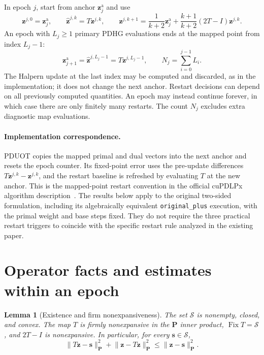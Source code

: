 \documentclass[11pt]{article}
\newtheorem{lemma}[theorem]{Lemma}
\theoremstyle{remark}
\newcommand{\Fix}{\operatorname{Fix}}
\newcommand{\np}[1]{\lVert#1\rVert_{\mathbf P}}
\begin{document}
In epoch $j$, start from anchor $\mathbf z_j^{\mathrm a}$ and use
\begin{equation}
\mathbf z^{j,0}=\mathbf z_j^{\mathrm a},\qquad \widehat{\mathbf z}^{j,k}=T\mathbf z^{j,k},\qquad \mathbf z^{j,k+1}=\frac{1}{k+2}\mathbf z_j^{\mathrm a}+\frac{k+1}{k+2}(2T-I)\mathbf z^{j,k}.
\label{eq:epoch}
\end{equation}
An epoch with $L_j\geq1$ primary PDHG evaluations ends at the mapped point from index $L_j-1$:
\begin{equation}
\mathbf z_{j+1}^{\mathrm a}=\widehat{\mathbf z}^{j,L_j-1}=T\mathbf z^{j,L_j-1},\qquad N_j=\sum_{i=0}^{j-1}L_i.
\label{eq:restart}
\end{equation}
The Halpern update at the last index may be computed and discarded, as in the implementation; it does not change the next anchor.
Restart decisions can depend on all previously computed quantities.
An epoch may instead continue forever, in which case there are only finitely many restarts.
The count $N_j$ excludes extra diagnostic map evaluations.

\paragraph{Implementation correspondence.}
PDUOT copies the mapped primal and dual vectors into the next anchor and resets the epoch counter.
Its fixed-point error uses the pre-update differences $T\mathbf z^{j,k}-\mathbf z^{j,k}$, and the restart baseline is refreshed by evaluating $T$ at the new anchor.
This is the mapped-point restart convention in the official cuPDLPx algorithm description~\cite{cupdlpxdocs}.
The results below apply to the original two-sided formulation, including its algebraically equivalent \texttt{original\_plus} execution, with the primal weight and base steps fixed.
They do not require the three practical restart triggers to coincide with the specific restart rule analyzed in the existing paper.

\section{Operator facts and estimates within an epoch}

\begin{lemma}[Existence and firm nonexpansiveness]
\label{lem:firm}
The set $\mathcal S$ is nonempty, closed, and convex.
The map $T$ is firmly nonexpansive in the $\mathbf P$ inner product, $\Fix T=\mathcal S$, and $2T-I$ is nonexpansive.
In particular, for every $\mathbf s\in\mathcal S$,
\begin{equation}
\np{T\mathbf z-\mathbf s}^2+\np{\mathbf z-T\mathbf z}^2\leq\np{\mathbf z-\mathbf s}^2.
\label{eq:firm}
\end{equation}
\end{lemma}
\end{document}
